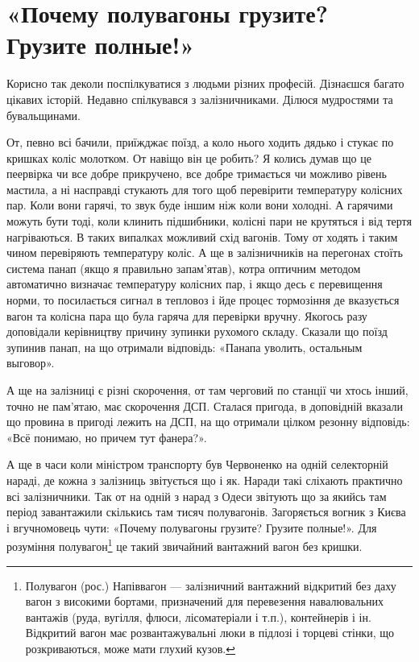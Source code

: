 \section*{«Почему полувагоны грузите? Грузите полные!»}



Корисно так деколи поспілкуватися з людьми різних професій. Дізнаєшся багато цікавих історій. Недавно спілкувався з залізничниками. Ділюся мудростями та бувальщинами.

От, певно всі бачили, приїжджає поїзд, а коло нього ходить дядько і стукає по кришках коліс молотком. От навіщо він це робить? Я колись думав  що це пеервірка чи все добре прикручено, все добре тримається чи можливо рівень мастила, а ні насправді стукають для того щоб перевірити температуру колісних пар. Коли вони гарячі, то звук буде іншим ніж коли вони холодні. А гарячими можуть бути тоді, коли клинить підшибники, колісні пари не крутяться і від тертя нагріваються. В таких випалках можливий схід вагонів. Тому от ходять і таким чином перевіряють температуру коліс. А ще в залізничників на перегонах стоїть система панап (якщо я правильно запам’ятав), котра оптичним методом автоматично визначає температуру колісних пар, і якщо десь є перевищення норми, то посилається сигнал в тепловоз і йде процес тормозіння де вказується вагон та колісна пара що була гаряча для перевірки вручну. Якогось разу доповідали керівництву причину зупинки рухомого складу. Сказали що поїзд зупинив панап, на що отримали відповідь: «Панапа уволить, остальным выговор».

А ще на залізниці є різні скорочення, от там черговий по станції чи хтось інший, точно не пам’ятаю, має скорочення ДСП. Сталася пригода, в доповідній вказали що провина в пригоді лежить на ДСП, на що отримали цілком резонну відповідь: «Всё понимаю, но причем тут фанера?».

А ще в часи коли міністром транспорту був Червоненко на одній селекторній нараді, де кожна з залізниць звітується що і як. Наради такі сліхають практично всі залізничники. Так от на одній з нарад з Одеси звітують що за якийсь там період завантажили скількись там тисяч полувагонів. Загоряється вогник з Києва і вгучномовець чути: «Почему полувагоны грузите? Грузите полные!». Для розуміння полувагон\footnote{Полувагон (рос.) Напіввагон — залізничний вантажний відкритий без даху вагон з високими бортами, призначений для перевезення навалювальних вантажів (руда, вугілля, флюси, лісоматеріали і т.п.), контейнерів і ін. Відкритий вагон має розвантажувальні люки в підлозі і торцеві стінки, що розкриваються, може мати глухий кузов.} це такий звичайний вантажний вагон без кришки.

